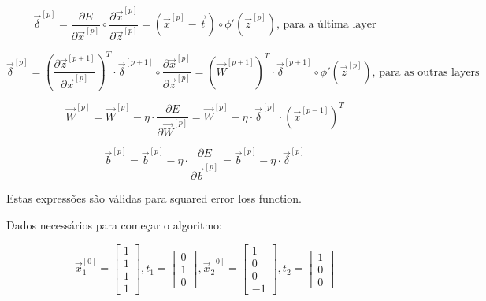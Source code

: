 \documentclass[a4paper,12pt]{article} %
\begin{document}
\begin{enumerate}
\begin{equation*}
    \vec{\delta}^{[p]} = \frac{\partial E}{\partial \vec{x}^{[p]}} \circ \frac{\partial \vec{x}^{[p]}}{\partial \vec{z}^{[p]}} = (\vec{x}^{[p]} - \vec{t}) \circ \phi'(\vec{z}^{[p]}) \text{, para a última layer}
\end{equation*}

\begin{equation*}
    \vec{\delta}^{[p]} = (\frac{\partial \vec{z}^{[p+1]}}{\partial \vec{x}^{[p]}})^T \cdot \vec{\delta}^{[p+1]} \circ \frac{\partial \vec{x}^{[p]}}{\partial \vec{z}^{[p]}} = (\vec{W}^{[p+1]})^T \cdot \vec{\delta}^{[p+1]} \circ \phi'(\vec{z}^{[p]}) \text{, para as outras layers}
\end{equation*}

\begin{equation*}
    \vec{W}^{[p]} = \vec{W}^{[p]} - \eta \cdot \frac{\partial E}{\partial \vec{W}^{[p]}} = \vec{W}^{[p]} - \eta \cdot \vec{\delta}^{[p]} \cdot (\vec{x}^{[p-1]})^T
\end{equation*}

\begin{equation*}
    \vec{b}^{[p]} = \vec{b}^{[p]} - \eta \cdot \frac{\partial E}{\partial \vec{b}^{[p]}} = \vec{b}^{[p]} - \eta \cdot \vec{\delta}^{[p]}
\end{equation*}

Estas expressões são válidas para squared error loss function.

Dados necessários para começar o algoritmo:

\begin{equation*}
    \vec{x}^{[0]}_1 = \begin{bmatrix} 1 \\ 1 \\ 1 \\ 1 \end{bmatrix} , t_1 = \begin{bmatrix} 0 \\ 1 \\ 0 \end{bmatrix} , \vec{x}^{[0]}_2 = \begin{bmatrix} 1 \\ 0 \\ 0 \\ -1 \end{bmatrix} , t_2 = \begin{bmatrix} 1 \\ 0 \\ 0 \end{bmatrix}
\end{equation*}


\end{enumerate}
\end{document}
